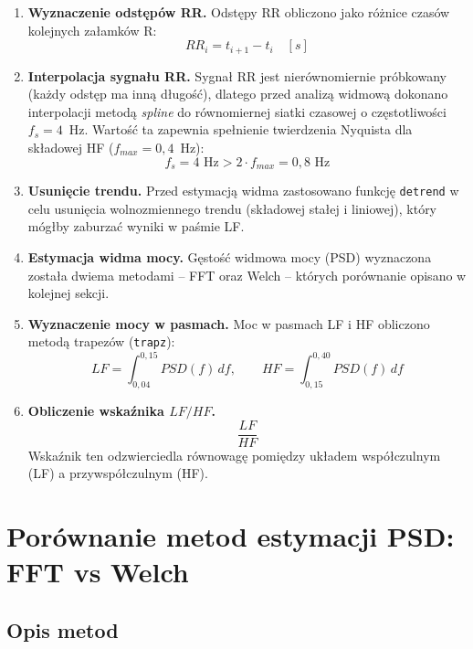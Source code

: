 \documentclass[a4paper,12pt]{article}
\begin{document}
\begin{enumerate}

    \item \textbf{Wyznaczenie odstępów RR.}
    Odstępy RR obliczono jako różnice czasów kolejnych załamków R:
    \[
        RR_i = t_{i+1} - t_i \quad [s]
    \]

    \item \textbf{Interpolacja sygnału RR.}
    Sygnał RR jest nierównomiernie próbkowany (każdy odstęp ma inną długość), dlatego przed analizą widmową dokonano interpolacji metodą \textit{spline} do równomiernej siatki czasowej o częstotliwości $f_s = 4$~Hz. Wartość ta zapewnia spełnienie twierdzenia Nyquista dla składowej HF ($f_{max} = 0{,}4$~Hz):
    \[
        f_s = 4 \text{ Hz} > 2 \cdot f_{max} = 0{,}8 \text{ Hz}
    \]

    \item \textbf{Usunięcie trendu.}
    Przed estymacją widma zastosowano funkcję \texttt{detrend} w celu usunięcia wolnozmiennego trendu (składowej stałej i liniowej), który mógłby zaburzać wyniki w paśmie LF.

    \item \textbf{Estymacja widma mocy.}
    Gęstość widmowa mocy (PSD) wyznaczona została dwiema metodami -- FFT oraz Welch -- których porównanie opisano w kolejnej sekcji.

    \item \textbf{Wyznaczenie mocy w pasmach.}
    Moc w pasmach LF i HF obliczono metodą trapezów (\texttt{trapz}):
    \[
        LF = \int_{0{,}04}^{0{,}15} PSD(f)\,df, \qquad
        HF = \int_{0{,}15}^{0{,}40} PSD(f)\,df
    \]

    \item \textbf{Obliczenie wskaźnika $LF/HF$.}
    \[
        \frac{LF}{HF}
    \]
    Wskaźnik ten odzwierciedla równowagę pomiędzy układem współczulnym (LF) a przywspółczulnym (HF).

\end{enumerate}


\section{Porównanie metod estymacji PSD: FFT vs Welch}
\label{sec:porownanie}

\subsection{Opis metod}
\end{document}
